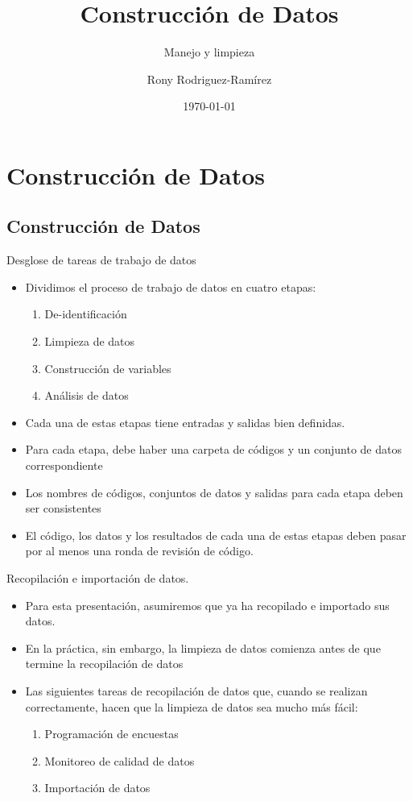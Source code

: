 \documentclass[10pt, aspectratio=169, compress]{beamer}
\title{Construcción de Datos}
\subtitle{Manejo y limpieza}
\author{Rony Rodriguez-Ramírez}
\institute{LAMBDA}
\date{\today}
\begin{document}
\begin{frame}[plain]
	\maketitle 
\end{frame}
\section{Construcción de Datos}
\subsection{Construcción de Datos}
\begin{frame}{Desglose de tareas de trabajo de datos}
	\begin{itemize}
		\item Dividimos el proceso de trabajo de datos en cuatro etapas:
		\begin{enumerate}
			\item De-identificación
			\item Limpieza de datos
			\item Construcción de variables
			\item Análisis de datos
		\end{enumerate}
		\item Cada una de estas etapas tiene entradas y salidas bien definidas.
		\item Para cada etapa, debe haber una carpeta de códigos y un conjunto de datos correspondiente
		\item Los nombres de códigos, conjuntos de datos y salidas para cada etapa deben ser consistentes
		\item El código, los datos y los resultados de cada una de estas etapas deben pasar por al menos una ronda de revisión de código.
	\end{itemize}
\end{frame}
\begin{frame}{Recopilación e importación de datos.}
	\begin{itemize}
		\item Para esta presentación, asumiremos que ya ha recopilado e importado sus datos.
		\item En la práctica, sin embargo, la limpieza de datos comienza antes de que termine la recopilación de datos
		\item Las siguientes tareas de recopilación de datos que, cuando se realizan correctamente, hacen que la limpieza de datos sea mucho más fácil:
		\begin{enumerate}
			\item Programación de encuestas
			\item Monitoreo de calidad de datos
			\item Importación de datos
		\end{enumerate}
	\end{itemize}
\end{frame}
\end{document}
